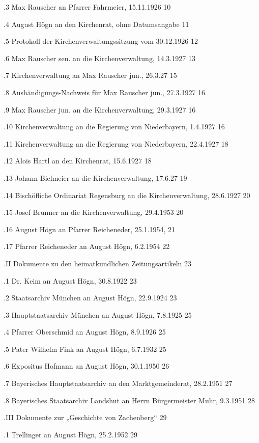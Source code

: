 \documentclass{book}
\begin{document}
.3 Max Rauscher an Pfarrer Fahrmeier, 15.11.1926    10

.4 August Högn an den Kirchenrat, ohne Datumsangabe 11

.5 Protokoll der Kirchenverwaltungssitzung vom 30.12.1926   12

.6 Max Rauscher sen. an die Kirchenverwaltung, 14.3.1927    13

.7 Kirchenverwaltung an Max Rauscher jun., 26.3.27  15

.8 Aushändigungs-Nachweis für Max Rauscher jun., 27.3.1927  16

.9 Max Rauscher jun. an die Kirchenverwaltung, 29.3.1927    16

.10 Kirchenverwaltung an die Regierung von Niederbayern, 1.4.1927   16

.11 Kirchenverwaltung an die Regierung von Niederbayern, 22.4.1927  18

.12 Alois Hartl an den Kirchenrat, 15.6.1927    18

.13 Johann Bielmeier an die Kirchenverwaltung, 17.6.27  19

.14 Bischöfliche Ordinariat Regensburg an die Kirchenverwaltung, 28.6.1927  20

.15 Josef Brunner an die Kirchenverwaltung, 29.4.1953   20

.16 August Högn an Pfarrer Reicheneder, 25.1.1954,  21

.17 Pfarrer Reicheneder an August Högn, 6.2.1954    22

.II Dokumente zu den heimatkundlichen Zeitungsartikeln  23

.1 Dr. Keim an August Högn, 30.8.1922   23

.2 Staatsarchiv München an August Högn, 22.9.1924   23

.3 Hauptstaatsarchiv München an August Högn, 7.8.1925   25

.4 Pfarrer Oberschmid an August Högn, 8.9.1926  25

.5 Pater Wilhelm Fink an August Högn, 6.7.1932  25

.6 Expositus Hofmann an August Högn, 30.1.1950  26

.7 Bayerisches Hauptstaatsarchiv an den Marktgemeinderat, 28.2.1951     27

.8 Bayerisches Staatsarchiv Landshut an Herrn Bürgermeister Muhr, 9.3.1951  28

.III Dokumente zur „Geschichte von Zachenberg“  29

.1 Trellinger an August Högn, 25.2.1952 29
\end{document}
